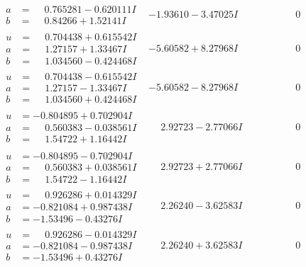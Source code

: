 \documentclass[1p]{elsarticle_modified}
\theoremstyle{definition}
\begin{document}
$$\begin{array}{c|c|c}
\begin{aligned}
a &= \phantom{-}0.765281 - 0.620111 I \\
b &= \phantom{-}0.84266 + 1.52141 I\end{aligned}
 & -1.93610 - 3.47025 I & \phantom{-0.000000 } 0 \\ \hline\begin{aligned}
u &= \phantom{-}0.704438 + 0.615542 I \\
a &= \phantom{-}1.27157 + 1.33467 I \\
b &= \phantom{-}1.034560 - 0.424468 I\end{aligned}
 & -5.60582 + 8.27968 I & \phantom{-0.000000 } 0 \\ \hline\begin{aligned}
u &= \phantom{-}0.704438 - 0.615542 I \\
a &= \phantom{-}1.27157 - 1.33467 I \\
b &= \phantom{-}1.034560 + 0.424468 I\end{aligned}
 & -5.60582 - 8.27968 I & \phantom{-0.000000 } 0 \\ \hline\begin{aligned}
u &= -0.804895 + 0.702904 I \\
a &= \phantom{-}0.560383 - 0.038561 I \\
b &= \phantom{-}1.54722 + 1.16442 I\end{aligned}
 & \phantom{-}2.92723 - 2.77066 I & \phantom{-0.000000 } 0 \\ \hline\begin{aligned}
u &= -0.804895 - 0.702904 I \\
a &= \phantom{-}0.560383 + 0.038561 I \\
b &= \phantom{-}1.54722 - 1.16442 I\end{aligned}
 & \phantom{-}2.92723 + 2.77066 I & \phantom{-0.000000 } 0 \\ \hline\begin{aligned}
u &= \phantom{-}0.926286 + 0.014329 I \\
a &= -0.821084 + 0.987438 I \\
b &= -1.53496 - 0.43276 I\end{aligned}
 & \phantom{-}2.26240 - 3.62583 I & \phantom{-0.000000 } 0 \\ \hline\begin{aligned}
u &= \phantom{-}0.926286 - 0.014329 I \\
a &= -0.821084 - 0.987438 I \\
b &= -1.53496 + 0.43276 I\end{aligned}
 & \phantom{-}2.26240 + 3.62583 I & \phantom{-0.000000 } 0 \\ \hline\begin{aligned}

\end{aligned}
\end{array}$$
\end{document}
